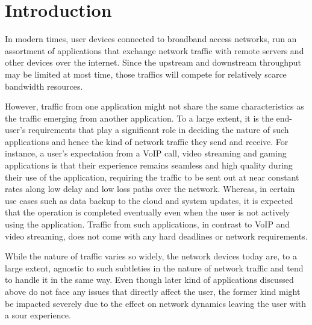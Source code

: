 \section{Introduction}
\label{sec:introduction}

In modern times, user devices connected to broadband access networks, run an assortment of applications that exchange network traffic with remote servers and other devices over the internet. Since the upstream and downstream throughput may be limited at most time, those traffics will compete for relatively scarce bandwidth resources. 

However, traffic from one application might not share the same characteristics as the traffic emerging from another application. To a large extent, it is the end-user’s requirements that play a significant role in deciding the nature of such applications and hence the kind of network traffic they send and receive. For instance, a user’s expectation from a VoIP call, video streaming and gaming applications is that their experience remains seamless and high quality during their use of the application, requiring the traffic to be sent out at near constant rates along low delay and low loss paths over the network. Whereas, in certain use cases such as data backup to the cloud and system updates, it is expected that the operation is completed eventually even when the user is not actively using the application. Traffic from such applications, in contrast to VoIP and video streaming, does not come with any hard deadlines or network requirements.

While the nature of traffic varies so widely, the network devices today are, to a large extent, agnostic to such subtleties in the nature of network traffic and tend to handle it in the same way. Even though later kind of applications discussed above do not face any issues that directly affect the user, the former kind might be impacted severely due to the effect on network dynamics leaving the user with a sour experience. 

